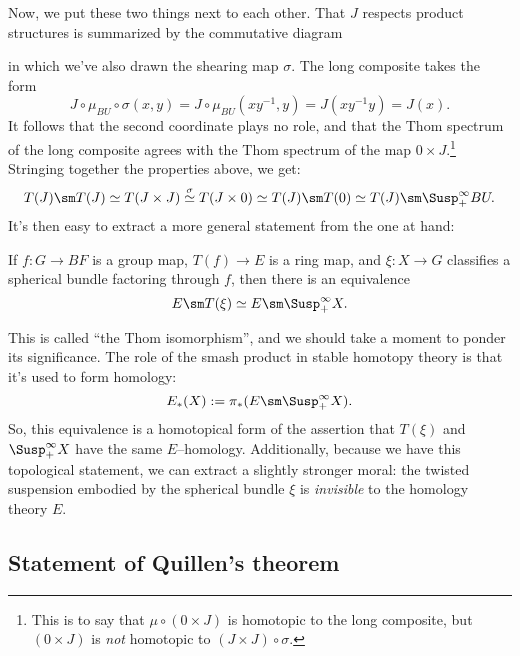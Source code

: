 Now, we put these two things next to each other.  That $J$ respects product structures is summarized by the commutative diagram
\begin{center}
\end{center}
in which we've also drawn the shearing map $\sigma$.  The long composite takes the form \[J \circ \mu_{BU} \circ \sigma (x, y) = J \circ \mu_{BU} (x y^{-1}, y) = J(x y^{-1} y) = J(x).\]  It follows that the second coordinate plays no role, and that the Thom spectrum of the long composite agrees with the Thom spectrum of the map $0 \times J$.\footnote{This is to say that $\mu \circ (0 \times J)$ is homotopic to the long composite, but $(0 \times J)$ is \emph{not} homotopic to $(J \times J) \circ \sigma$.}  Stringing together the properties above, we get: \[T(J) \sm T(J) \simeq T(J \times J) \stackrel{\sigma}{\simeq} T(J \times 0) \simeq T(J) \sm T(0) \simeq T(J) \sm \Susp^\infty_+ BU.\]  It's then easy to extract a more general statement from the one at hand:
\begin{theorem}
If $f: G \to BF$ is a group map, $T(f) \to E$ is a ring map, and $\xi: X \to G$ classifies a spherical bundle factoring through $f$, then there is an equivalence \[E \sm T(\xi) \simeq E \sm \Susp^\infty_+ X.\]
\end{theorem}

This is called ``the Thom isomorphism'', and we should take a moment to ponder its significance.  The role of the smash product in stable homotopy theory is that it's used to form homology: \[E_*(X) := \pi_*(E \sm \Susp^\infty_+ X).\]  So, this equivalence is a homotopical form of the assertion that $T(\xi)$ and $\Susp^\infty_+ X$ have the same $E$--homology.  Additionally, because we have this topological statement, we can extract a slightly stronger moral: the twisted suspension embodied by the spherical bundle $\xi$ is \emph{invisible} to the homology theory $E$.



\subsection*{Statement of Quillen's theorem}

